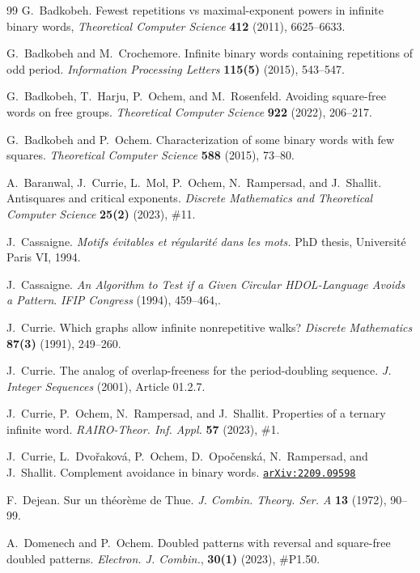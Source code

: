 \documentclass{article}
\newcommand{\arxiv}[1]{\href{http://arxiv.org/abs/#1}{\texttt{arXiv:#1}}}
\theoremstyle{plain}
\theoremstyle{definition}
\theoremstyle{remark}
\begin{document}
% 
\begin{thebibliography}{99}
 G.~Badkobeh.
Fewest repetitions vs maximal-exponent powers in infinite binary words,
\emph{Theoretical Computer Science} {\bf 412} (2011), 6625--6633.

 G.~Badkobeh and M.~Crochemore.
Infinite binary words containing repetitions of odd period.
\emph{Information Processing Letters} {\bf 115(5)} (2015),  543--547.

 G.~Badkobeh, T.~Harju, P.~Ochem, and M.~Rosenfeld.
Avoiding square-free words on free groups.
\emph{Theoretical Computer Science} {\bf 922} (2022),  206--217.

 G.~Badkobeh and P.~Ochem.
Characterization of some binary words with few squares.
\emph{Theoretical Computer Science} {\bf 588} (2015), 73--80.

 A.~Baranwal, J.~Currie, L.~Mol, P.~Ochem, N.~Rampersad, and J.~Shallit.
Antisquares and critical exponents.
\emph{Discrete Mathematics and Theoretical Computer Science} {\bf 25(2)} (2023), \#11.

 J.~Cassaigne.
\emph{{Motifs \'evitables et r\'egularit\'e dans les mots.}}
PhD thesis, {Universit\'e Paris VI}, 1994.

 J.~Cassaigne.
\emph{An Algorithm to Test if a Given Circular HDOL-Language Avoids a Pattern}.
\emph{IFIP Congress} (1994), 459--464,.

 J.~Currie.
Which graphs allow infinite nonrepetitive walks?
\emph{Discrete Mathematics} {\bf 87(3)} (1991), 249--260.

 J.~Currie.
The analog of overlap-freeness for the period-doubling sequence.
\emph{J. Integer Sequences} (2001), Article 01.2.7.

 J.~Currie, P.~Ochem, N.~Rampersad, and J.~Shallit.
Properties of a ternary infinite word.
\emph{RAIRO-Theor. Inf. Appl.} {\bf 57} (2023), \#1.

 J.~Currie, L.~Dvořaková, P.~Ochem, D.~Opočenská, N.~Rampersad, and J.~Shallit.
Complement avoidance in binary words.
\arxiv{2209.09598}

 F.~Dejean.
Sur un th\'eor\`eme de Thue.
\emph{J. Combin. Theory. Ser. A} {\bf 13} (1972), 90--99.

 A.~Domenech and P.~Ochem.
Doubled patterns with reversal and square-free doubled patterns.
\emph{Electron. J. Combin.}, {\bf 30(1)} (2023), \#P1.50.


\end{thebibliography}
\end{document}
